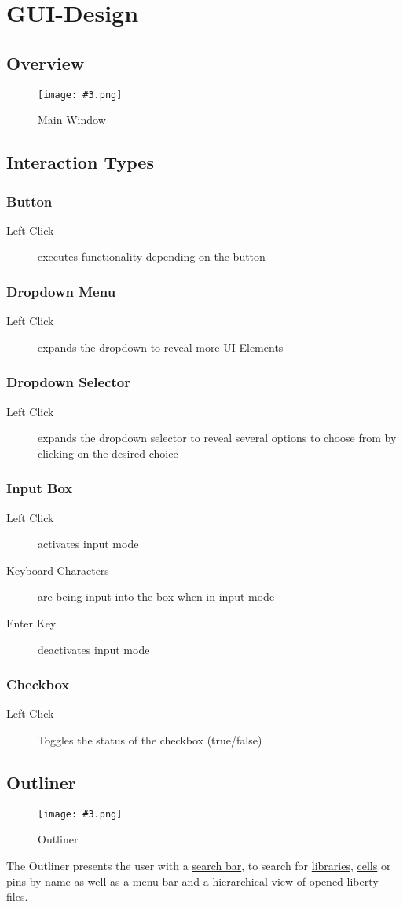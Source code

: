 \documentclass[10pt,a4paper]{report}
\newcommand{\refer}[2]{\hyperref[#1]{\textcolor{col:reference}{#2}}}
\newcommand{\h}[1]{\textcolor{col:highlight}{#1}}
\newcommand{\defit}[3]{\subsection{#2}\label{it:#1}#3}
\newcommand{\refg}[2]{\refer{glo:#1}{#2}}
\newcommand{\includeimage}[5]{
    \begin{figure}[H]
        #1
        \texttt{[image: \#3.png]}
        \caption{#4}
        \label{fig:#5}
    \end{figure}
}
\begin{document}
\chapter{GUI-Design}
\section{Overview}
\includeimage{}{0.4}{Main Window}{Main Window}{main_window}

\section{Interaction Types}
\defit{button}{Button}{
    \begin{description}
        \item[Left Click]{executes functionality depending on the button}
    \end{description}
}
\defit{dropdown_menu}{Dropdown Menu}{
    \begin{description}
            \item[Left Click]{expands the dropdown to reveal more UI Elements}
    \end{description}
}
\defit{dropdown_selector}{Dropdown Selector}{
    \begin{description}
            \item[Left Click]{expands the dropdown selector to reveal several options to choose from by clicking on the desired choice}
    \end{description}
}
\defit{input_box}{Input Box}{
    \begin{description}
        \item[Left Click]{activates \h{input mode}}
        \item[Keyboard Characters]{are being input into the box when in \h{input mode}}
        \item[Enter Key]{deactivates \h{input mode}}
    \end{description}
}
\defit{checkbox}{Checkbox}{
    \begin{description}
        \item[Left Click]{Toggles the status of the checkbox (true/false)}
    \end{description}
}

\section{Outliner}
\label{sec:outliner}
\includeimage{}{0.4}{Outliner}{Outliner}{outliner}
The \h{Outliner} presents the user with a \refer{sec:outliner:search}{search bar}, to search for \refg{library}{libraries}, \refg{cell}{cells} or \refg{pin}{pins} by name as well as a \refer{sec:outliner:menu}{menu bar} and a \refer{sec:outliner:hierarchy}{hierarchical view} of opened liberty files.
\end{document}
